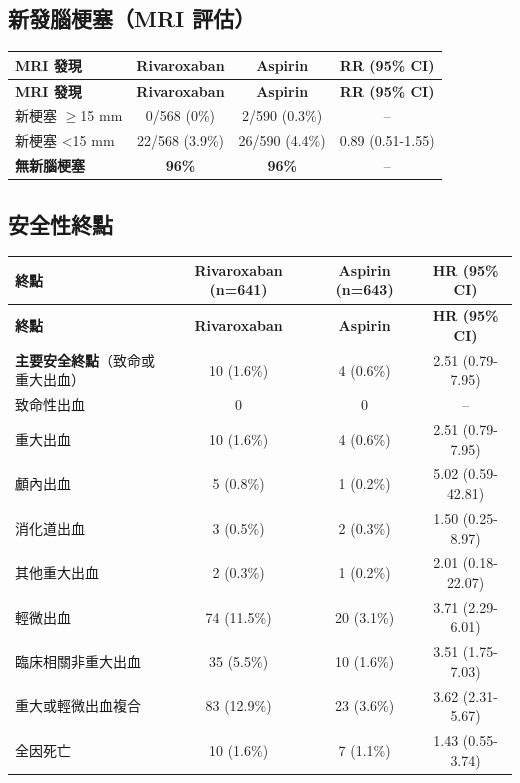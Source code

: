 \documentclass[12pt,a4paper]{article}
\begin{document}
\subsection{新發腦梗塞（MRI 評估）}

\begin{longtable}{p{6cm}ccc}
\toprule
\textbf{MRI 發現} & \textbf{Rivaroxaban} & \textbf{Aspirin} & \textbf{RR (95\% CI)} \\
\midrule
\endfirsthead
\toprule
\textbf{MRI 發現} & \textbf{Rivaroxaban} & \textbf{Aspirin} & \textbf{RR (95\% CI)} \\
\midrule
\endhead
\bottomrule
\endfoot

新梗塞 $\geq$15 mm & 0/568 (0\%) & 2/590 (0.3\%) & -- \\
新梗塞 <15 mm & 22/568 (3.9\%) & 26/590 (4.4\%) & 0.89 (0.51-1.55) \\
\textbf{無新腦梗塞} & \textbf{96\%} & \textbf{96\%} & -- \\
\bottomrule
\end{longtable}

\subsection{安全性終點}

\begin{longtable}{p{6cm}ccc}
\toprule
\textbf{終點} & \textbf{Rivaroxaban (n=641)} & \textbf{Aspirin (n=643)} & \textbf{HR (95\% CI)} \\
\midrule
\endfirsthead
\toprule
\textbf{終點} & \textbf{Rivaroxaban} & \textbf{Aspirin} & \textbf{HR (95\% CI)} \\
\midrule
\endhead
\bottomrule
\endfoot

\textbf{主要安全終點}\newline（致命或重大出血） & 10 (1.6\%) & 4 (0.6\%) & 2.51 (0.79-7.95) \\
\midrule
致命性出血 & 0 & 0 & -- \\
重大出血 & 10 (1.6\%) & 4 (0.6\%) & 2.51 (0.79-7.95) \\
\quad 顱內出血 & 5 (0.8\%) & 1 (0.2\%) & 5.02 (0.59-42.81) \\
\quad 消化道出血 & 3 (0.5\%) & 2 (0.3\%) & 1.50 (0.25-8.97) \\
\quad 其他重大出血 & 2 (0.3\%) & 1 (0.2\%) & 2.01 (0.18-22.07) \\
\midrule
輕微出血 & 74 (11.5\%) & 20 (3.1\%) & 3.71 (2.29-6.01) \\
臨床相關非重大出血 & 35 (5.5\%) & 10 (1.6\%) & 3.51 (1.75-7.03) \\
重大或輕微出血複合 & 83 (12.9\%) & 23 (3.6\%) & 3.62 (2.31-5.67) \\
\midrule
全因死亡 & 10 (1.6\%) & 7 (1.1\%) & 1.43 (0.55-3.74) \\
\bottomrule
\end{longtable}
\end{document}
